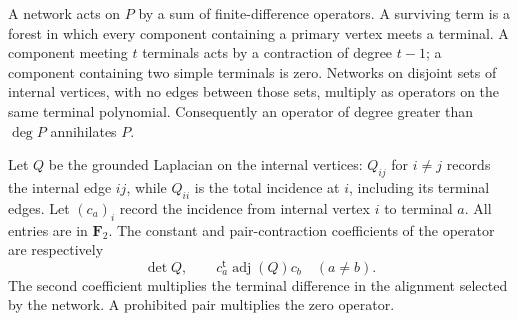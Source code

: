 \begin{lemma}\label{gr:network}
A network acts on $P$ by a sum of finite-difference operators.  A surviving
term is a forest in which every component containing a primary vertex
meets a terminal.  A component meeting $t$ terminals acts by a contraction
of degree $t-1$; a component containing two simple terminals is zero.
Networks on disjoint sets of internal vertices, with no edges between
those sets, multiply as operators on the same terminal polynomial.
Consequently an operator of degree greater than $\deg P$ annihilates $P$.

Let $Q$ be the grounded Laplacian on the internal vertices: $Q_{ij}$ for
$i\ne j$ records the internal edge $ij$, while $Q_{ii}$ is the total
incidence at $i$, including its terminal edges.  Let $(c_a)_i$ record the
incidence from internal vertex $i$ to terminal $a$.  All entries are in
$\mathbf F_2$.  The constant and pair-contraction coefficients of the
operator are respectively
\begin{equation}\label{gr:forest-coefficients}
 \det Q,\qquad c_a^{\mathsf t}\operatorname{adj}(Q)c_b\quad(a\ne b).
\end{equation}
The second coefficient multiplies the terminal difference in the alignment
selected by the network.  A prohibited pair multiplies the zero operator.
\end{lemma}


